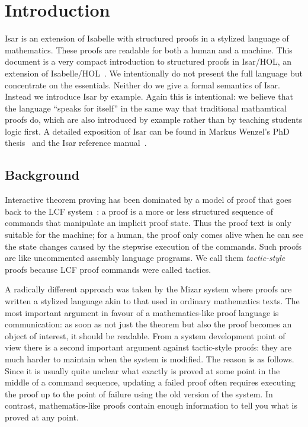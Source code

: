\section{Introduction}

Isar is an extension of Isabelle with structured proofs in a stylized
language of mathematics. These proofs are readable for both a human
and a machine.  This document is a very compact introduction to
structured proofs in Isar/HOL, an extension of
Isabelle/HOL~\cite{LNCS2283}. We intentionally do not present the full
language but concentrate on the essentials. Neither do we give a
formal semantics of Isar. Instead we introduce Isar by example. Again
this is intentional: we believe that the language ``speaks for
itself'' in the same way that traditional mathamtical proofs do, which
are also introduced by example rather than by teaching students logic
first. A detailed exposition of Isar can be found in Markus Wenzel's
PhD thesis~\cite{Wenzel-PhD} and the Isar reference
manual~\cite{Isar-Ref-Man}.

\subsection{Background}

Interactive theorem proving has been dominated by a model of proof
that goes back to the LCF system~\cite{LCF}: a proof is a more or less
structured sequence of commands that manipulate an implicit proof
state. Thus the proof text is only suitable for the machine; for a
human, the proof only comes alive when he can see the state changes
caused by the stepwise execution of the commands. Such proofs are like
uncommented assembly language programs. We call them
\emph{tactic-style} proofs because LCF proof commands were called
tactics.

A radically different approach was taken by the Mizar
system
where proofs are written a stylized language akin to that used in
ordinary mathematics texts. The most important argument in favour of a
mathematics-like proof language is communication: as soon as not just
the theorem but also the proof becomes an object of interest, it
should be readable.  From a system development point of view there is
a second important argument against tactic-style proofs: they are much
harder to maintain when the system is modified. The reason is as
follows. Since it is usually quite unclear what exactly is proved at
some point in the middle of a command sequence, updating a failed
proof often requires executing the proof up to the point of failure
using the old version of the system.  In contrast, mathematics-like
proofs contain enough information to tell you what is proved at any
point.

